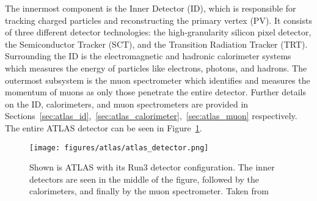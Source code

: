 The innermost component is the Inner Detector (ID), which is responsible for tracking charged particles and reconstructing the primary vertex (PV). It consists of three different detector technologies: the high-granularity silicon pixel detector, the Semiconductor Tracker (SCT), and the Transition Radiation Tracker (TRT). Surrounding the ID is the electromagnetic and hadronic calorimeter systems which measures the energy of particles like electrons, photons, and hadrons. The outermost subsystem is the muon spectrometer which identifies and measures the momentum of muons as only those penetrate the entire detector.
Further details on the ID, calorimeters, and muon spectrometers are provided in Sections~\ref{sec:atlas_id},~\ref{sec:atlas_calorimeter},~\ref{sec:atlas_muon} respectively. The entire ATLAS detector can be seen in Figure~\ref{fig:atlas_detector}.

\begin{figure}[pht]
    \centering
    \texttt{[image: figures/atlas/atlas\_detector.png]}
    \caption{Shown is ATLAS with its Run3 detector configuration. The inner detectors are seen in the middle of the figure, followed by the calorimeters, and finally by the muon spectrometer. Taken from~\cite{atlas_figure}}\label{fig:atlas_detector}
\end{figure}